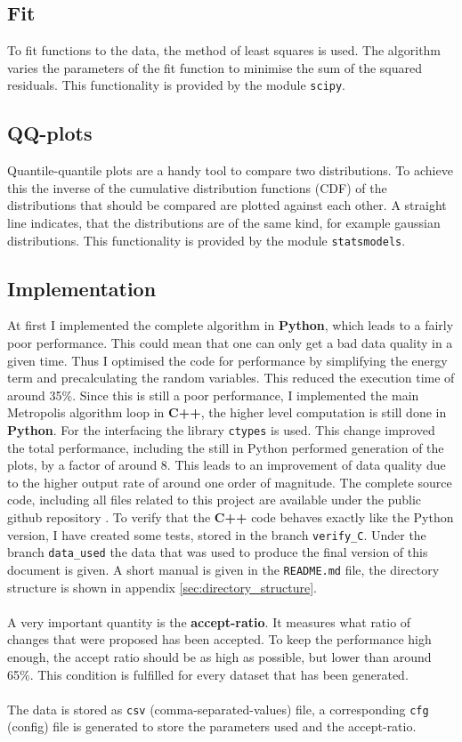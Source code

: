 \documentclass{scrartcl}
\begin{document}
	\subsection{Fit}
		To fit functions to the data, the method of least squares is used.
		The algorithm varies the parameters of the fit function to minimise the sum of the squared residuals.
		This functionality is provided by the module \verb!scipy!.

	\subsection{QQ-plots}
		Quantile-quantile plots are a handy tool to compare two distributions.
		To achieve this the inverse of the cumulative distribution functions (CDF) of the distributions that should be compared are plotted against each other.
		A straight line indicates, that the distributions are of the same kind, for example gaussian distributions.
		This functionality is provided by the module \verb!statsmodels!.

	\subsection{Implementation}
		At first I implemented the complete algorithm in \textbf{Python}, which leads to a fairly poor performance.
		This could mean that one can only get a bad data quality in a given time.
		Thus I optimised the code for performance by simplifying the energy term and precalculating the random variables.
		This reduced the execution time of around 35\%.
		Since this is still a poor performance, I implemented the main Metropolis algorithm loop in \textbf{C++}, the higher level computation is still done in \textbf{Python}.
		For the interfacing the library \verb!ctypes! is used.
		This change improved the total performance, including the still in Python performed generation of the plots, by a factor of around 8.
		This leads to an improvement of data quality due to the higher output rate of around one order of magnitude.
		The complete source code, including all files related to this project are available under the public github repository \cite{github}.
		To verify that the \textbf{C++} code behaves exactly like the Python version, I have created some tests, stored in the branch \verb!verify_C!.
		Under the branch \verb!data_used! the data that was used to produce the final version of this document is given.
		A short manual is given in the \verb!README.md! file, the directory structure is shown in appendix \ref{sec:directory_structure}.
		\\\\
		A very important quantity is the \textbf{accept-ratio}.
		It measures what ratio of changes that were proposed has been accepted.
		To keep the performance high enough, the accept ratio should be as high as possible, but lower than around 65\%.
		This condition is fulfilled for every dataset that has been generated.
		\\\\
		The data is stored as \verb!csv! (comma-separated-values) file, a corresponding \verb!cfg! (config) file is generated to store the parameters used and the accept-ratio.
\end{document}
